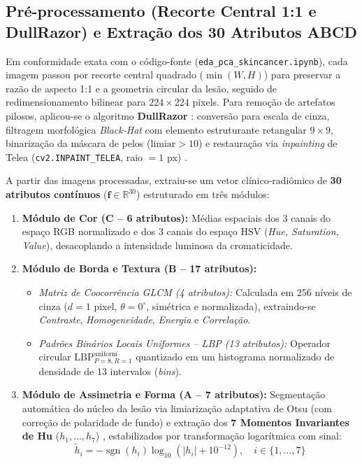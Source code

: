 \documentclass[12pt,a4paper]{article}
\begin{document}
\subsection{Pré-processamento (Recorte Central 1:1 e DullRazor) e Extração dos 30 Atributos ABCD}
Em conformidade exata com o código-fonte (\texttt{eda\_pca\_skincancer.ipynb}), cada imagem passou por recorte central quadrado ($\min(W, H)$) para preservar a razão de aspecto 1:1 e a geometria circular da lesão, seguido de redimensionamento bilinear para $224 \times 224$ pixels. Para remoção de artefatos pilosos, aplicou-se o algoritmo \textbf{DullRazor} \cite{lee1997}: conversão para escala de cinza, filtragem morfológica \textit{Black-Hat} com elemento estruturante retangular $9 \times 9$, binarização da máscara de pelos ($\text{limiar} > 10$) e restauração via \textit{inpainting} de Telea (\texttt{cv2.INPAINT\_TELEA}, raio $= 1$ px) \cite{telea2004}.

A partir das imagens processadas, extraiu-se um vetor clínico-radiômico de \textbf{30 atributos contínuos} ($\mathbf{f} \in \mathbb{R}^{30}$) estruturado em três módulos:
\begin{enumerate}
    \item \textbf{Módulo de Cor (C -- 6 atributos):} Médias espaciais dos 3 canais do espaço RGB normalizado e dos 3 canais do espaço HSV (\textit{Hue, Saturation, Value}), desacoplando a intensidade luminosa da cromaticidade.
    \item \textbf{Módulo de Borda e Textura (B -- 17 atributos):}
    \begin{itemize}
        \item \textit{Matriz de Coocorrência GLCM \cite{haralick1973} (4 atributos):} Calculada em 256 níveis de cinza ($d=1$ pixel, $\theta=0^\circ$, simétrica e normalizada), extraindo-se \textit{Contraste}, \textit{Homogeneidade}, \textit{Energia} e \textit{Correlação}.
        \item \textit{Padrões Binários Locais Uniformes -- LBP \cite{ojala2002} (13 atributos):} Operador circular $\text{LBP}_{P=8, R=1}^{\text{uniform}}$ quantizado em um histograma normalizado de densidade de 13 intervalos (\textit{bins}).
    \end{itemize}
    \item \textbf{Módulo de Assimetria e Forma (A -- 7 atributos):} Segmentação automática do núcleo da lesão via limiarização adaptativa de Otsu \cite{otsu1979} (com correção de polaridade de fundo) e extração dos \textbf{7 Momentos Invariantes de Hu} ($h_1, \dots, h_7$) \cite{hu1962}, estabilizados por transformação logarítmica com sinal:
    \begin{equation}
        \tilde{h}_i = -\operatorname{sgn}(h_i) \log_{10}\!\left(|h_i| + 10^{-12}\right), \quad i \in \{1, \dots, 7\}
    \end{equation}
\end{enumerate}
\end{document}
